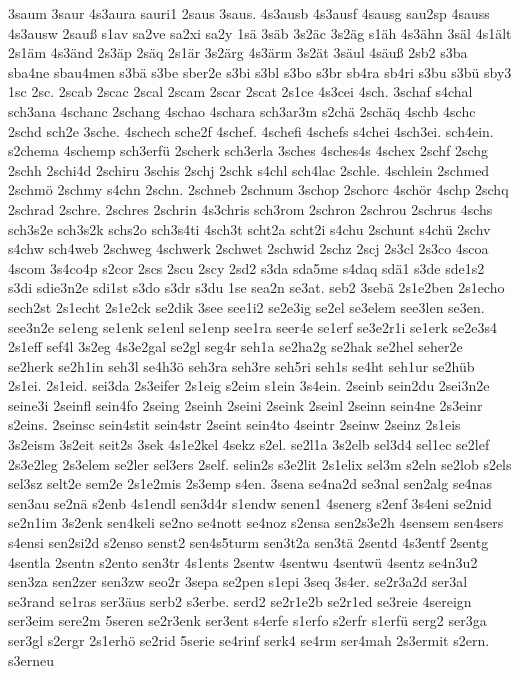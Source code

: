 {3saum
3saur
4s3aura
sauri1
2saus
3saus.
4s3ausb
4s3ausf
4sausg
sau2sp
4sauss
4s3ausw
2sauß
s1av
sa2ve
sa2xi
sa2y
1sä
3säb
3s2äc
3s2äg
s1äh
4s3ähn
3säl
4s1ält
2s1äm
4s3änd
2s3äp
2säq
2s1är
3s2ärg
4s3ärm
3s2ät
3säul
4säuß
2sb2
s3ba
sba4ne
sbau4men
s3bä
s3be
sber2e
s3bi
s3bl
s3bo
s3br
sb4ra
sb4ri
s3bu
s3bü
sby3
1sc
2sc.
2scab
2scac
2scal
2scam
2scar
2scat
2s1ce
4s3cei
4sch.
3schaf
s4chal
sch3ana
4schanc
2schang
4schao
4schara
sch3ar3m
s2chä
2schäq
4schb
4schc
2schd
sch2e
3sche.
4schech
sche2f
4schef.
4schefi
4schefs
s4chei
4sch3ei.
sch4ein.
s2chema
4schemp
sch3erfü
2scherk
sch3erla
3sches
4sches4s
4schex
2schf
2schg
2schh
2schi4d
2schiru
3schis
2schj
2schk
s4chl
sch4lac
2schle.
4schlein
2schmed
2schmö
2schmy
s4chn
2schn.
2schneb
2schnum
3schop
2schorc
4schör
4schp
2schq
2schrad
2schre.
2schres
2schrin
4s3chris
sch3rom
2schron
2schrou
2schrus
4schs
sch3s2e
sch3s2k
schs2o
sch3s4ti
4sch3t
scht2a
scht2i
s4chu
2schunt
s4chü
2schv
s4chw
sch4web
2schweg
4schwerk
2schwet
2schwid
2schz
2scj
2s3cl
2s3co
4scoa
4scom
3s4co4p
s2cor
2scs
2scu
2scy
2sd2
s3da
sda5me
s4daq
sdä1
s3de
sde1s2
s3di
sdie3n2e
sdi1st
s3do
s3dr
s3du
1se
sea2n
se3at.
seb2
3sebä
2s1e2ben
2s1echo
sech2st
2s1echt
2s1e2ck
se2dik
3see
see1i2
se2e3ig
se2el
se3elem
see3len
se3en.
see3n2e
se1eng
se1enk
se1enl
se1enp
see1ra
seer4e
se1erf
se3e2r1i
se1erk
se2e3s4
2s1eff
sef4l
3s2eg
4s3e2gal
se2gl
seg4r
seh1a
se2ha2g
se2hak
se2hel
seher2e
se2herk
se2h1in
seh3l
se4h3ö
seh3ra
seh3re
seh5ri
seh1s
se4ht
seh1ur
se2hüb
2s1ei.
2s1eid.
sei3da
2s3eifer
2s1eig
s2eim
s1ein
3s4ein.
2seinb
sein2du
2sei3n2e
seine3i
2seinfl
sein4fo
2seing
2seinh
2seini
2seink
2seinl
2seinn
sein4ne
2s3einr
s2eins.
2seinsc
sein4stit
sein4str
2seint
sein4to
4seintr
2seinw
2seinz
2s1eis
3s2eism
3s2eit
seit2s
3sek
4s1e2kel
4sekz
s2el.
se2l1a
3s2elb
sel3d4
sel1ec
se2lef
2s3e2leg
2s3elem
se2ler
sel3ers
2self.
selin2s
s3e2lit
2s1elix
sel3m
s2eln
se2lob
s2els
sel3sz
selt2e
sem2e
2s1e2mis
2s3emp
s4en.
3sena
se4na2d
se3nal
sen2alg
se4nas
sen3au
se2nä
s2enb
4s1endl
sen3d4r
s1endw
senen1
4senerg
s2enf
3s4eni
se2nid
se2n1im
3s2enk
sen4keli
se2no
se4nott
se4noz
s2ensa
sen2s3e2h
4sensem
sen4sers
s4ensi
sen2si2d
s2enso
senst2
sen4s5turm
sen3t2a
sen3tä
2sentd
4s3entf
2sentg
4sentla
2sentn
s2ento
sen3tr
4s1ents
2sentw
4sentwu
4sentwü
4sentz
se4n3u2
sen3za
sen2zer
sen3zw
seo2r
3sepa
se2pen
s1epi
3seq
3s4er.
se2r3a2d
ser3al
se3rand
se1ras
ser3äus
serb2
s3erbe.
serd2
se2r1e2b
se2r1ed
se3reie
4sereign
ser3eim
sere2m
5seren
se2r3enk
ser3ent
s4erfe
s1erfo
s2erfr
s1erfü
serg2
ser3ga
ser3gl
s2ergr
2s1erhö
se2rid
5serie
se4rinf
serk4
se4rm
ser4mah
2s3ermit
s2ern.
s3erneu
}
